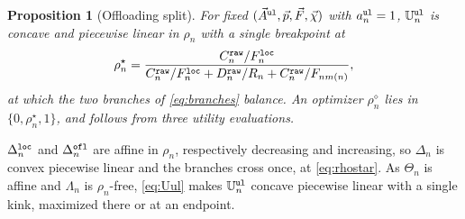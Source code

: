 \documentclass[journal]{IEEEtran}
\newtheorem{proposition}{Proposition}
\begin{document}
\begin{proposition}[Offloading split]\label{prop:rho}
For fixed $(\vec{A}^{\tt ul},\vec{p},\vec{F},\vec{\chi})$ with $a_n^{\tt ul}=1$, $\mathbb{U}_n^{\tt ul}$ is concave and piecewise linear in $\rho_n$ with a single breakpoint at
\begin{equation}
\rho_n^\star
=\frac{C_n^{\tt raw}/F_n^{\tt loc}}
{C_n^{\tt raw}/F_n^{\tt loc}+D_n^{\tt raw}/R_n+C_n^{\tt raw}/F_{n m(n)}},
\label{eq:rhostar}
\end{equation}
at which the two branches of \eqref{eq:branches} balance. 
{\color{blue}An optimizer $\rho_n^\diamond$ lies in $\{0,\rho_n^\star,1\}$, and follows from three utility evaluations.}
\end{proposition}
\begin{IEEEproof}
$\Delta_n^{\tt loc}$ and $\Delta_n^{\tt ofl}$ are affine in $\rho_n$, respectively decreasing and increasing, so $\Delta_n$ is convex piecewise linear and the branches cross once, at \eqref{eq:rhostar}. As $\Theta_n$ is affine and $\Lambda_n$ is $\rho_n$-free, \eqref{eq:Uul} makes $\mathbb{U}_n^{\tt ul}$ concave piecewise linear with a single kink, maximized there or at an endpoint.
\end{IEEEproof}
\end{document}

